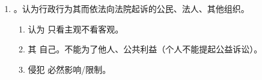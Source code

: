\begin{enumerate}
\begin{kk}{先复议后起诉被告的选择问题}
\begin{enumerate}
\begin{enumerate}
                    \item 看清诉的哪个主体。
                          。
                  \end{enumerate}
            \item {}。。改变实体权利、义务、结果。。
            \item {}。。
                  。
                  \begin{enumerate}
                    \item {}。
                    \item 审过 + 结果没动。。注意变相维持、判驳。
                    \item {}。
                    \item {}。
                    \item {}（只有这一种）。。
                    \item 复议维持本质上是重复处理的一种。题目一定会出现“复议”两字。
                  \end{enumerate}
            \item 多行为、多请求、多因素 = 按复议维持处理。一个复议决定里既有改变，又有维持。
                  。
          \end{enumerate}
          \tcblower
          排除法。审过了排除不作为，结果没动排除改变。
        \end{kk}
  \item {}。认为行政行为其而依法向法院起诉的公民、法人、其他组织。
        \begin{enumerate}
          \item 认为 \yjt 只看主观不看客观。
          \item 其 \yjt 自己。不能为了他人、公共利益（个人不能提起公益诉讼）。
          \item 侵犯 \yjt 必然影响/限制。

\end{enumerate}
\end{enumerate}
